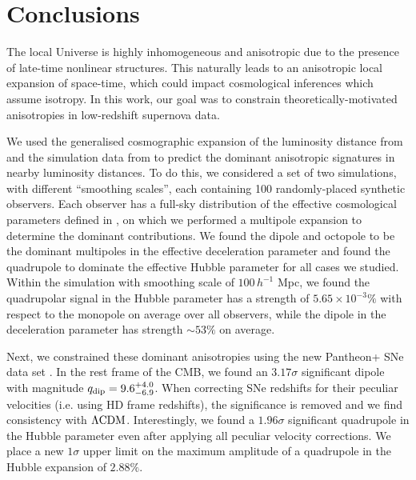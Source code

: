 \documentclass[fleqn,usenatbib]{mnras}
\newcommand{\lcdm}{$\Lambda\rm{CDM}$} %
\begin{document}
\section{Conclusions}
{%
{The local Universe is highly inhomogeneous and anisotropic due to the presence of late-time nonlinear structures. }
This {naturally} leads to an anisotropic local expansion {of space-time}, which could impact {cosmological inferences which assume isotropy. 
In this work, {our goal was to} constrain theoretically-motivated anisotropies in %
low-redshift supernova data}. %

{We used} the {generalised cosmographic expansion of the luminosity distance from} %
\citet{Heinesen_2021} and the {simulation data} from \citet{Macpherson_Heinesen_2021} {to predict the dominant anisotropic signatures in nearby luminosity distances. To do this, we considered a set of two simulations, with different ``smoothing scales'', each containing 100 randomly-placed synthetic observers. Each observer has a full-sky distribution of the effective cosmological parameters defined in \citet{Heinesen_2021}, on which we performed a multipole expansion to determine the dominant contributions. }
We found %
{the} dipole and octopole {to be the dominant multipoles} in the {effective} deceleration parameter and {found the} quadrupole {to dominate the effective} Hubble parameter {for all cases we studied.} %
Within the simulation with smoothing scale of $100 \,h^{-1}$ Mpc, we found {the quadrupolar signal in the Hubble parameter has a} %
strength of $5.65 \times 10^{-3}\%$ with respect to the monopole {on average over all observers, while the} dipole in the deceleration parameter {has strength} $\sim 53 \%$ {on average}. 

{Next, we constrained these dominant anisotropies} using the {new} Pantheon+ {SNe} data set \citep{scolnic2021pantheon+}. {In the rest frame of the CMB, }
we found an {$ 3.17 \sigma$} significant dipole %
{with} magnitude {$q_{\rm dip}= 9.6^{+4.0}_{-6.9}$}. 
{When correcting SNe redshifts for their peculiar velocities (i.e. using HD frame redshifts), the significance is removed and we find consistency with \lcdm. \citep[see also,][]{Sorrenti2022}}
 {Interestingly, we found a {$1.96 \sigma$}} significant quadrupole in the Hubble parameter %
{even after applying all peculiar velocity corrections. }
{We place a new $1\sigma$ upper limit on the maximum amplitude of a quadrupole in the Hubble expansion of {$2.88\%$}. }

}
\end{document}
